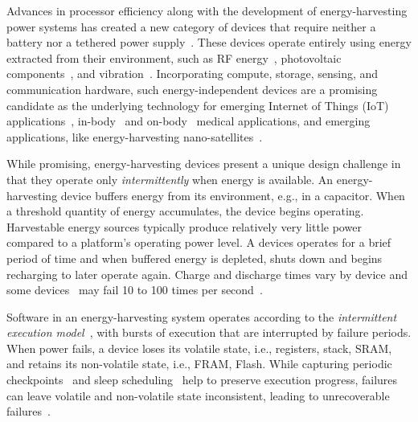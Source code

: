 Advances in processor efficiency along with the development of energy-harvesting power systems has created a new category of devices that require neither a battery nor a tethered power supply~\cite{prasad_comst_2014,lucia_snapl_2017,soyata_csm_2016}. These devices operate entirely using energy extracted from their environment, such as RF energy~\cite{rf_powered_computing_gollakota_2014}, photovoltaic components~\cite{margolies_infocom_2016,margolies_tosn_2016}, and vibration~\cite{gorlatova_sigmetrics_2014}. Incorporating compute, storage, sensing, and communication hardware, such energy-independent devices are a promising candidate as the underlying technology for emerging Internet of Things (IoT) applications~\cite{ku_cst_2016}, in-body~\cite{nadeau_naturebio_2017} and on-body~\cite{bandodkar_electroanalysis_2015} medical applications, and emerging applications, like energy-harvesting nano-satellites~\cite{kicksat}.

While promising, energy-harvesting devices present a unique design challenge in
that they operate only {\em intermittently} when energy is available. An
energy-harvesting device buffers energy from its environment, e.g., in a
capacitor. When a threshold quantity of energy accumulates, the device begins
operating. Harvestable energy sources typically produce relatively very little
power compared to a platform's operating power level. A devices operates for a
brief period of time and when buffered energy is depleted, shuts down and
begins recharging to later operate again. Charge and discharge times vary by
device and some devices~\cite{wisp} may fail 10 to 100 times per second~\cite{}.

Software in an energy-harvesting system operates according to the {\em
intermittent execution model}~\cite{dino}, with bursts of execution that are
interrupted by failure periods. When power fails, a device loses its volatile
state, i.e., registers, stack, SRAM, and retains its non-volatile state, i.e.,
FRAM, Flash. While capturing periodic checkpoints~\cite{mementos,tictpl,quickrecall}
and sleep scheduling~\cite{dewdrop,hibernus,hibernusplusplus} help to preserve
execution progress, failures can leave volatile and non-volatile state inconsistent, leading to unrecoverable failures~\cite{mspcdino,edb,edbtoppicks}. 


